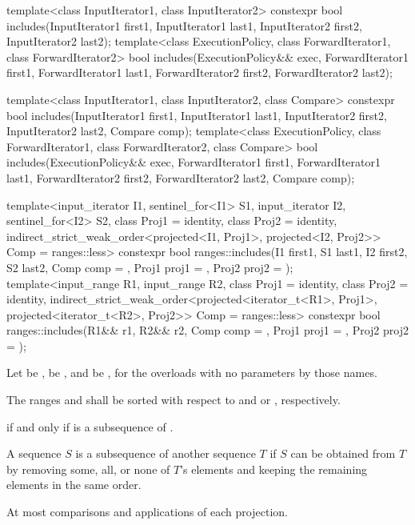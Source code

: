 %
\begin{itemdecl}
template<class InputIterator1, class InputIterator2>
  constexpr bool includes(InputIterator1 first1, InputIterator1 last1,
                          InputIterator2 first2, InputIterator2 last2);
template<class ExecutionPolicy, class ForwardIterator1, class ForwardIterator2>
  bool includes(ExecutionPolicy&& exec,
                ForwardIterator1 first1, ForwardIterator1 last1,
                ForwardIterator2 first2, ForwardIterator2 last2);

template<class InputIterator1, class InputIterator2, class Compare>
  constexpr bool includes(InputIterator1 first1, InputIterator1 last1,
                          InputIterator2 first2, InputIterator2 last2,
                          Compare comp);
template<class ExecutionPolicy, class ForwardIterator1, class ForwardIterator2, class Compare>
  bool includes(ExecutionPolicy&& exec,
                ForwardIterator1 first1, ForwardIterator1 last1,
                ForwardIterator2 first2, ForwardIterator2 last2,
                Compare comp);

template<input_iterator I1, sentinel_for<I1> S1, input_iterator I2, sentinel_for<I2> S2,
         class Proj1 = identity, class Proj2 = identity,
         indirect_strict_weak_order<projected<I1, Proj1>,
                                    projected<I2, Proj2>> Comp = ranges::less>
  constexpr bool ranges::includes(I1 first1, S1 last1, I2 first2, S2 last2, Comp comp = {},
                                  Proj1 proj1 = {}, Proj2 proj2 = {});
template<input_range R1, input_range R2, class Proj1 = identity,
         class Proj2 = identity,
         indirect_strict_weak_order<projected<iterator_t<R1>, Proj1>,
                                    projected<iterator_t<R2>, Proj2>> Comp = ranges::less>
  constexpr bool ranges::includes(R1&& r1, R2&& r2, Comp comp = {},
                                  Proj1 proj1 = {}, Proj2 proj2 = {});
\end{itemdecl}

\begin{itemdescr}
\pnum
Let  be ,
 be , and
 be ,
for the overloads with no parameters by those names.

\pnum
\requires
The ranges  and  shall be sorted
with respect to  and  or , respectively.

\pnum
\returns
{}
if and only if  is a subsequence of .
\begin{note}
A sequence $S$ is a subsequence of another sequence $T$ if $S$ can be obtained
from $T$ by removing some, all, or none of $T$'s elements and keeping the
remaining elements in the same order.
\end{note}

\pnum
\complexity
At most 
comparisons and applications of each projection.
\end{itemdescr}

